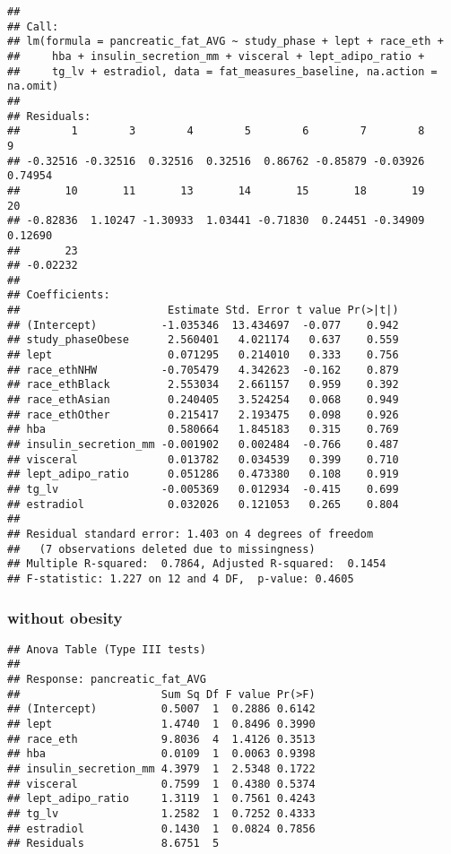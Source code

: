 \documentclass[
]{article}
\begin{document}
\begin{verbatim}
## 
## Call:
## lm(formula = pancreatic_fat_AVG ~ study_phase + lept + race_eth + 
##     hba + insulin_secretion_mm + visceral + lept_adipo_ratio + 
##     tg_lv + estradiol, data = fat_measures_baseline, na.action = na.omit)
## 
## Residuals:
##        1        3        4        5        6        7        8        9 
## -0.32516 -0.32516  0.32516  0.32516  0.86762 -0.85879 -0.03926  0.74954 
##       10       11       13       14       15       18       19       20 
## -0.82836  1.10247 -1.30933  1.03441 -0.71830  0.24451 -0.34909  0.12690 
##       23 
## -0.02232 
## 
## Coefficients:
##                       Estimate Std. Error t value Pr(>|t|)
## (Intercept)          -1.035346  13.434697  -0.077    0.942
## study_phaseObese      2.560401   4.021174   0.637    0.559
## lept                  0.071295   0.214010   0.333    0.756
## race_ethNHW          -0.705479   4.342623  -0.162    0.879
## race_ethBlack         2.553034   2.661157   0.959    0.392
## race_ethAsian         0.240405   3.524254   0.068    0.949
## race_ethOther         0.215417   2.193475   0.098    0.926
## hba                   0.580664   1.845183   0.315    0.769
## insulin_secretion_mm -0.001902   0.002484  -0.766    0.487
## visceral              0.013782   0.034539   0.399    0.710
## lept_adipo_ratio      0.051286   0.473380   0.108    0.919
## tg_lv                -0.005369   0.012934  -0.415    0.699
## estradiol             0.032026   0.121053   0.265    0.804
## 
## Residual standard error: 1.403 on 4 degrees of freedom
##   (7 observations deleted due to missingness)
## Multiple R-squared:  0.7864, Adjusted R-squared:  0.1454 
## F-statistic: 1.227 on 12 and 4 DF,  p-value: 0.4605
\end{verbatim}

\hypertarget{without-obesity-1}{%
\subsubsection{without obesity}\label{without-obesity-1}}

\begin{verbatim}
## Anova Table (Type III tests)
## 
## Response: pancreatic_fat_AVG
##                      Sum Sq Df F value Pr(>F)
## (Intercept)          0.5007  1  0.2886 0.6142
## lept                 1.4740  1  0.8496 0.3990
## race_eth             9.8036  4  1.4126 0.3513
## hba                  0.0109  1  0.0063 0.9398
## insulin_secretion_mm 4.3979  1  2.5348 0.1722
## visceral             0.7599  1  0.4380 0.5374
## lept_adipo_ratio     1.3119  1  0.7561 0.4243
## tg_lv                1.2582  1  0.7252 0.4333
## estradiol            0.1430  1  0.0824 0.7856
## Residuals            8.6751  5
\end{verbatim}
\end{document}
